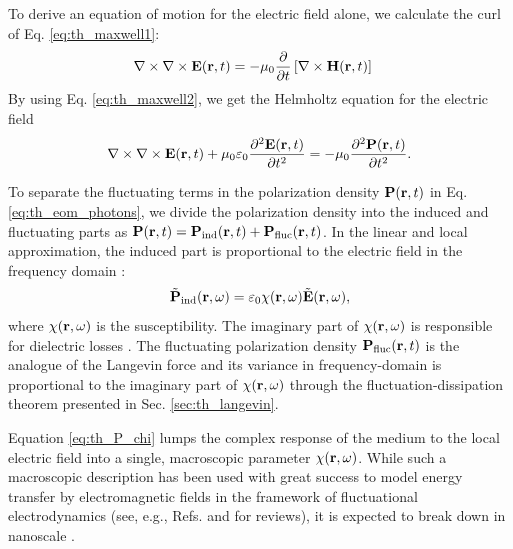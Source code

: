 To derive an equation of motion for the electric field alone, we calculate the curl of Eq. \eqref{eq:th_maxwell1}:
\begin{alignat}{2}
  \nabla \times \nabla \times \mathbf{E}(\mathbf{r},t) &= - \mu_0 \frac{\partial}{\partial t} \left[\nabla \times \mathbf{H}(\mathbf{r},t) \right] 
\end{alignat}
By using Eq. \eqref{eq:th_maxwell2}, we get the Helmholtz equation for the electric field \cite{novotny}
\begin{equation}
   \nabla \times \nabla \times \bE(\br,t) + \mu_0 \varepsilon_0 \frac{\partial ^2\bb{E}(\br,t)}{\partial t^2}=  - \mu_0 \frac{\partial^2 \bb{P}(\br,t)}{\partial t^2}. \label{eq:th_eom_photons} %
\end{equation}

To separate the fluctuating terms in the polarization density $\mathbf{P}(\mathbf{r},t)$ in Eq. \eqref{eq:th_eom_photons}, we divide the polarization density into the induced and fluctuating parts as $\mathbf{P}(\mathbf{r},t)=\mathbf{P}_{\textrm{ind}}(\mathbf{r},t)+ \mathbf{P}_{\textrm{fluc}}(\mathbf{r},t)$. In the linear and local approximation, the induced part is proportional to the electric field in the frequency domain \cite{novotny}:
\begin{equation}
 \tilde{\mathbf{P}}_{\textrm{ind}}(\mathbf{r},\omega)= \varepsilon_0 \chi(\mathbf{r},\omega) \tilde{\mathbf{E}}(\mathbf{r},\omega), \label{eq:th_P_chi}
\end{equation}
where $\chi(\mathbf{r},\omega)$ is the susceptibility. The imaginary part of $\chi(\mathbf{r},\omega)$ is responsible for dielectric losses \cite{jackson}. The fluctuating polarization density $\mathbf{P}_{\textrm{fluc}}(\mathbf{r},t)$ is the analogue of the Langevin force and its variance in frequency-domain is proportional to the imaginary part of $\chi(\mathbf{r},\omega)$ through the fluctuation-dissipation theorem presented in Sec. \ref{sec:th_langevin}.

Equation \eqref{eq:th_P_chi} lumps the complex response of the medium to the local electric field into a single, macroscopic parameter $\chi(\mathbf{r},\omega)$. While such a macroscopic description has been used with great success to model energy transfer by electromagnetic fields in the framework of fluctuational electrodynamics \cite{rytov} (see, e.g., Refs. \cite{joulain05} and \cite{volokitin07} for reviews), it is expected to break down in nanoscale \cite{chalopin12b}. 

